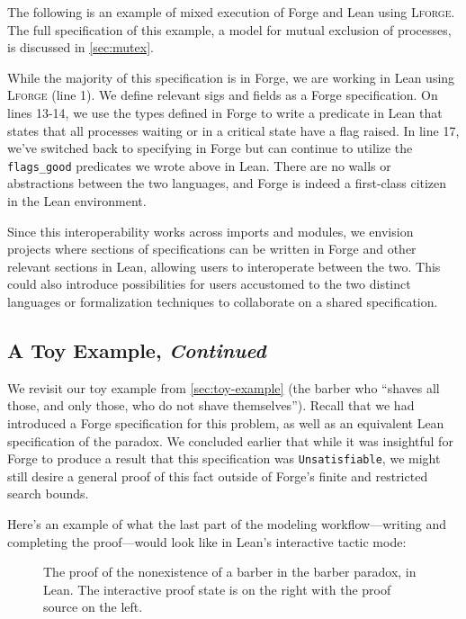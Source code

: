 The following is an example of mixed execution of Forge and Lean using \textsc{Lforge}. The full specification of this example, a model for mutual exclusion of processes, is discussed in \cref{sec:mutex}. 



While the majority of this specification is in Forge, we are working in Lean using \textsc{Lforge} (line 1). We define relevant sigs and fields as a Forge specification. On lines 13-14, we use the types defined in Forge to write a predicate in Lean that states that all processes waiting or in a critical state have a flag raised. In line 17, we've switched back to specifying in Forge but can continue to utilize the \texttt{flags\_good} predicates we wrote above in Lean. There are no walls or abstractions between the two languages, and Forge is indeed a first-class citizen in the Lean environment. 

Since this interoperability works across imports and modules, we envision projects where sections of specifications can be written in Forge and other relevant sections in Lean, allowing users to interoperate between the two. This could also introduce possibilities for users accustomed to the two distinct languages or formalization techniques to collaborate on a shared specification. 

\subsection{A Toy Example, \emph{Continued}}\label{sec:toy-example-continued}

We revisit our toy example from \cref{sec:toy-example} (the barber who ``shaves all those, and only those, who do not shave themselves''). Recall that we had introduced a Forge specification for this problem, as well as an equivalent Lean specification of the paradox. We concluded earlier that while it was insightful for Forge to produce a result that this specification was \texttt{Unsatisfiable}, we might still desire a general proof of this fact outside of Forge's finite and restricted search bounds. 

Here's an example of what the last part of the modeling workflow---writing and completing the proof---would look like in Lean's interactive tactic mode: 

\begin{figure}[h!]
  \centering
  \caption{The proof of the nonexistence of a barber in the barber paradox, in Lean. The interactive proof state is on the right with the proof source on the left. }
  \label{fig:barber-proof}
\end{figure}

